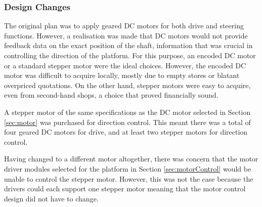\subsubsection{Design Changes}
The original plan was to apply geared \ac{DC} motors for both drive and steering functions. However, a realisation was made that \ac{DC} motors would not provide feedback data on the exact position of the shaft, information that was crucial in controlling the direction of the platform. For this purpose, an encoded \ac{DC} motor or a standard stepper motor were the ideal choices. However, the encoded \ac{DC} motor was difficult to acquire locally, mostly due to empty stores or blatant overpriced quotations. On the other hand, stepper motors were easy to acquire, even from second-hand shops, a choice that proved financially sound.
\par
A stepper motor of the same specifications as the \ac{DC} motor selected in Section \ref{sec:motor} was purchased for direction control. This meant there was a total of four geared \ac{DC} motors for drive, and at least two stepper motors for direction control.
\par
Having changed to a different motor altogether, there was concern that the motor driver modules selected for the platform in Section \ref{sec:motorControl} would be unable to control the stepper motor. However, this was not the case because the drivers could each support one stepper motor meaning that the motor control design did not have to change.

